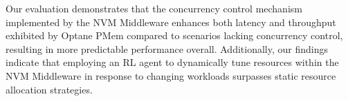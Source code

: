 \documentclass[11pt]{report}
\begin{document}
Our evaluation demonstrates that the concurrency control mechanism implemented by the NVM Middleware enhances both latency and throughput exhibited by Optane PMem compared to scenarios lacking concurrency control, resulting in more predictable performance overall. Additionally, our findings indicate that employing an RL agent to dynamically tune resources within the NVM Middleware in response to changing workloads surpasses static resource allocation strategies.

\startofchapters









\appendix
\appendixeqnumbering












\end{document}
